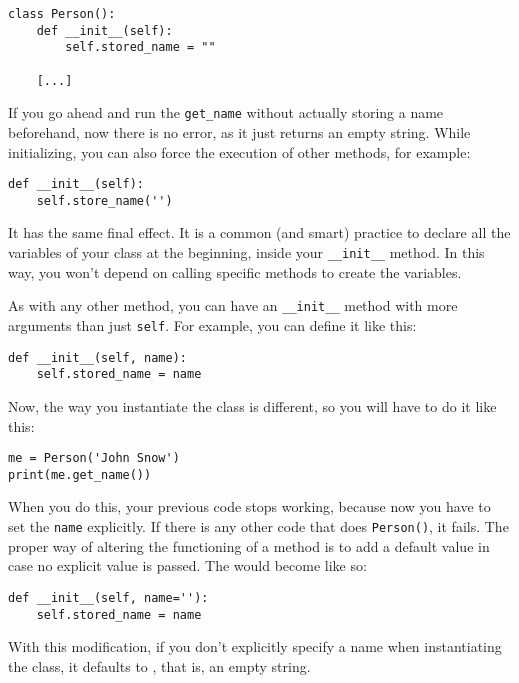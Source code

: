 \begin{verbatim}
class Person():
    def __init__(self):
        self.stored_name = ""

    [...]
\end{verbatim}

If you go ahead and run the \texttt{get_name} without actually storing a name beforehand, now there is no error, as it just returns an empty string. While initializing, you can also force the execution of other methods, for example:

\begin{verbatim}
def __init__(self):
    self.store_name('')
\end{verbatim}

It has the same final effect. It is a common (and smart) practice to declare all the variables of your class at the beginning, inside your \texttt{__init__} method. In this way, you won't depend on calling specific methods to create the variables.

As with any other method, you can have an \texttt{__init__} method with more arguments than just \texttt{self}. For example, you can define it like this:

\begin{verbatim}
def __init__(self, name):
    self.stored_name = name
\end{verbatim}

Now, the way you instantiate the class is different, so you will have to do it like this:

\begin{verbatim}
me = Person('John Snow')
print(me.get_name())
\end{verbatim}

When you do this, your previous code stops working, because now you have to set the \texttt{name} explicitly. If there is any other code that does \texttt{Person()}, it fails. The proper way of altering the functioning of a method is to add a default value in case no explicit value is passed. The  would become like so:

\begin{verbatim}
def __init__(self, name=''):
    self.stored_name = name
\end{verbatim}

With this modification, if you don't explicitly specify a name when instantiating the class, it defaults to , that is, an empty string.

